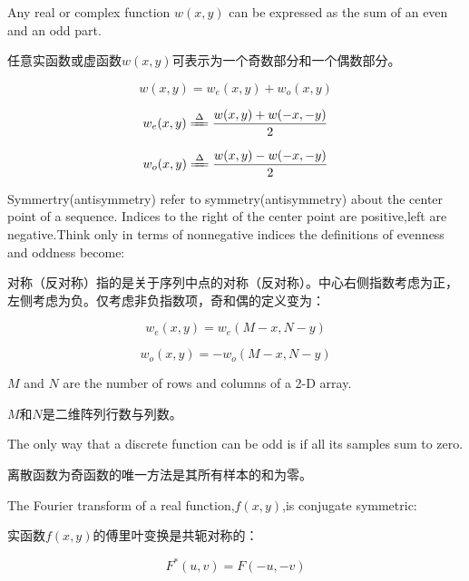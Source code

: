 \documentclass[12pt]{article}
\numberwithin{equation}{section}%
\begin{document}
Any real or complex function $w(x,y)$ can be expressed as the sum of an even and an odd part. 

任意实函数或虚函数$w(x,y)$可表示为一个奇数部分和一个偶数部分。

\begin{equation} \label{4.32}
w(x,y)=w_{e}(x,y)+w_{o}(x,y)
\end{equation}

\begin{equation} \label{4.33}
w_{e}(x,y)\xlongequal{\Delta}\frac{w(x,y)+w(-x,-y)}{2} 
\end{equation}

\begin{equation} \label{4.34}
w_{o}(x,y)\xlongequal{\Delta}\frac{w(x,y)-w(-x,-y)}{2}
\end{equation}

Symmertry(antisymmetry) refer to symmetry(antisymmetry) about the center point of a sequence.  Indices to the right of the center point are positive,left are negative.Think only in terms of nonnegative indices the definitions of evenness and oddness become:

对称（反对称）指的是关于序列中点的对称（反对称）。中心右侧指数考虑为正，左侧考虑为负。仅考虑非负指数项，奇和偶的定义变为：

\begin{equation} \label{4.35}
w_{e}(x,y)=w_{e}(M-x,N-y)
\end{equation}

\begin{equation} \label{4.36}
w_{o}(x,y)=-w_{o}(M-x,N-y)
\end{equation}

$M$ and $N$ are the number of rows and columns of a 2-D array.

$M$和$N$是二维阵列行数与列数。

The only way that a discrete function can be odd is if all its samples sum to zero.

离散函数为奇函数的唯一方法是其所有样本的和为零。

The Fourier transform of a real function,$f(x,y)$,is conjugate symmetric:

实函数$f(x,y)$的傅里叶变换是共轭对称的：

\begin{equation} \label{4.37}
F^{*}(u,v)=F(-u,-v)
\end{equation}












\end{document}
